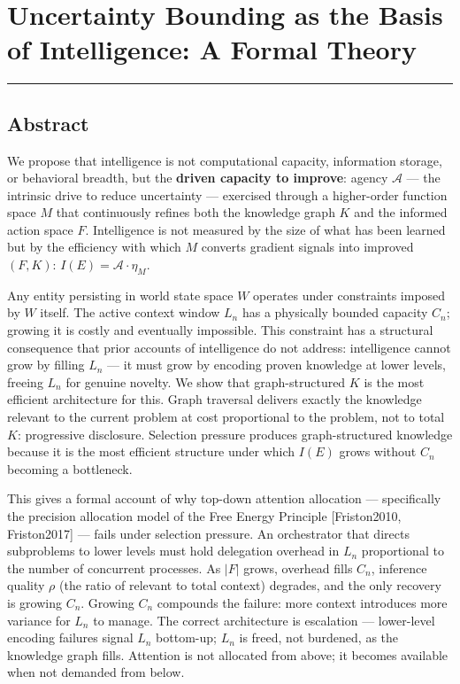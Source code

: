 \documentclass[
]{article}
\author{}
\date{}
\begin{document}
\section{Uncertainty Bounding as the Basis of Intelligence: A Formal
Theory}\label{uncertainty-bounding-as-the-basis-of-intelligence-a-formal-theory}

\begin{center}\rule{0.5\linewidth}{0.5pt}\end{center}

\subsection{Abstract}\label{abstract}

We propose that intelligence is not computational capacity, information
storage, or behavioral breadth, but the \textbf{driven capacity to
improve}: agency \(\mathcal{A}\) --- the intrinsic drive to reduce
uncertainty --- exercised through a higher-order function space \(M\)
that continuously refines both the knowledge graph \(K\) and the
informed action space \(F\). Intelligence is not measured by the size of
what has been learned but by the efficiency with which \(M\) converts
gradient signals into improved \((F, K)\):
\(I(E) = \mathcal{A} \cdot \eta_M\).

Any entity persisting in world state space \(W\) operates under
constraints imposed by \(W\) itself. The active context window \(L_n\)
has a physically bounded capacity \(C_n\); growing it is costly and
eventually impossible. This constraint has a structural consequence that
prior accounts of intelligence do not address: intelligence cannot grow
by filling \(L_n\) --- it must grow by encoding proven knowledge at
lower levels, freeing \(L_n\) for genuine novelty. We show that
graph-structured \(K\) is the most efficient architecture for this.
Graph traversal delivers exactly the knowledge relevant to the current
problem at cost proportional to the problem, not to total \(K\):
progressive disclosure. Selection pressure produces graph-structured
knowledge because it is the most efficient structure under which
\(I(E)\) grows without \(C_n\) becoming a bottleneck.

This gives a formal account of why top-down attention allocation ---
specifically the precision allocation model of the Free Energy Principle
{[}Friston2010, Friston2017{]} --- fails under selection pressure. An
orchestrator that directs subproblems to lower levels must hold
delegation overhead in \(L_n\) proportional to the number of concurrent
processes. As \(|F|\) grows, overhead fills \(C_n\), inference quality
\(\rho\) (the ratio of relevant to total context) degrades, and the only
recovery is growing \(C_n\). Growing \(C_n\) compounds the failure: more
context introduces more variance for \(L_n\) to manage. The correct
architecture is escalation --- lower-level encoding failures signal
\(L_n\) bottom-up; \(L_n\) is freed, not burdened, as the knowledge
graph fills. Attention is not allocated from above; it becomes available
when not demanded from below.
\end{document}
